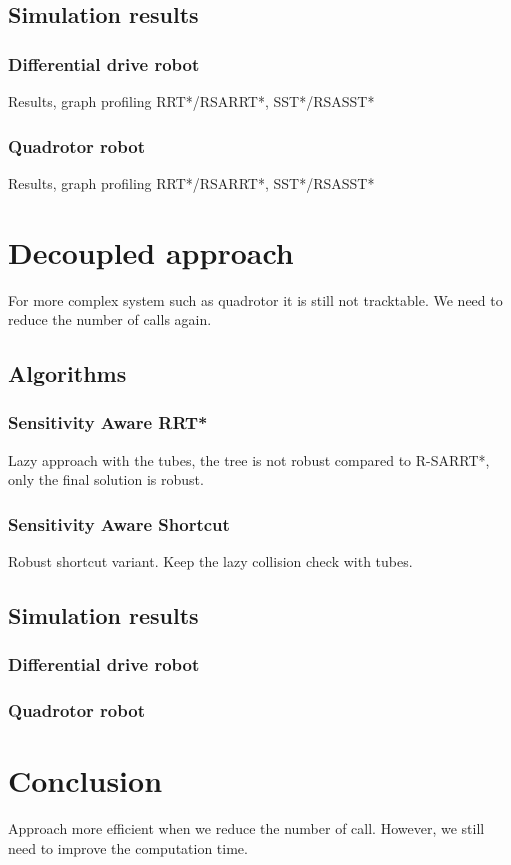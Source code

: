 \subsection{Simulation results}
\subsubsection{Differential drive robot}
Results, graph profiling RRT*/RSARRT*, SST*/RSASST*
\subsubsection{Quadrotor robot}
Results, graph profiling RRT*/RSARRT*, SST*/RSASST*

\section{Decoupled approach}
For more complex system such as quadrotor it is still not tracktable. We need to reduce the number of calls again.
\subsection{Algorithms}
\subsubsection{Sensitivity Aware RRT*}
Lazy approach with the tubes, the tree is not robust compared to R-SARRT*, only the final solution is robust.
\subsubsection{Sensitivity Aware Shortcut}
Robust shortcut variant.
Keep the lazy collision check with tubes.

\subsection{Simulation results}
\subsubsection{Differential drive robot}
\subsubsection{Quadrotor robot}

\section{Conclusion}
Approach more efficient when we reduce the number of call. 
However, we still need to improve the computation time.

\todomarker{}